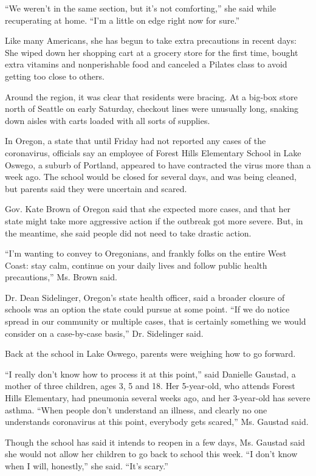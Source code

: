 ``We weren't in the same section, but it's not comforting,'' she said
while recuperating at home. ``I'm a little on edge right now for sure.''

Like many Americans, she has begun to take extra precautions in recent
days: She wiped down her shopping cart at a grocery store for the first
time, bought extra vitamins and nonperishable food and canceled a
Pilates class to avoid getting too close to others.

Around the region, it was clear that residents were bracing. At a
big-box store north of Seattle on early Saturday, checkout lines were
unusually long, snaking down aisles with carts loaded with all sorts of
supplies.

In Oregon, a state that until Friday had not reported any cases of the
coronavirus, officials say an employee of Forest Hills Elementary School
in Lake Oswego, a suburb of Portland, appeared to have contracted the
virus more than a week ago. The school would be closed for several days,
and was being cleaned, but parents said they were uncertain and scared.

Gov. Kate Brown of Oregon said that she expected more cases, and that
her state might take more aggressive action if the outbreak got more
severe. But, in the meantime, she said people did not need to take
drastic action.

``I'm wanting to convey to Oregonians, and frankly folks on the entire
West Coast: stay calm, continue on your daily lives and follow public
health precautions,'' Ms. Brown said.

Dr. Dean Sidelinger, Oregon's state health officer, said a broader
closure of schools was an option the state could pursue at some point.
``If we do notice spread in our community or multiple cases, that is
certainly something we would consider on a case-by-case basis,'' Dr.
Sidelinger said.

Back at the school in Lake Oswego, parents were weighing how to go
forward.

``I really don't know how to process it at this point,'' said Danielle
Gaustad, a mother of three children, ages 3, 5 and 18. Her 5-year-old,
who attends Forest Hills Elementary, had pneumonia several weeks ago,
and her 3-year-old has severe asthma. ``When people don't understand an
illness, and clearly no one understands coronavirus at this point,
everybody gets scared,'' Ms. Gaustad said.

Though the school has said it intends to reopen in a few days, Ms.
Gaustad said she would not allow her children to go back to school this
week. ``I don't know when I will, honestly,'' she said. ``It's scary.''

